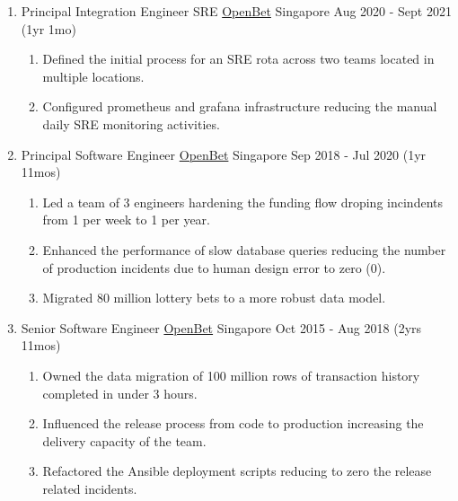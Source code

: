 \documentclass{CVSoftwareEngineer}
\begin{document}
\begin{enumerate}[labelwidth=!, labelindent=0pt, leftmargin=*, rightmargin=15pt]
		\item[] \cvExperience
			{Principal Integration Engineer \textbar SRE}
			{\href{https://www.openbet.com/}{OpenBet}}
			{Singapore}
			{Aug 2020 - Sept 2021 (1yr 1mo)}
			{\begin{enumerate}[labelwidth=!, labelindent=0pt, nosep, leftmargin=*]
					\item[\textasteriskcentered] Defined the initial process for an SRE rota across two teams located in multiple locations.
					\item[\textasteriskcentered] Configured prometheus and grafana infrastructure reducing the manual daily SRE monitoring activities.
				\end{enumerate}
			}

		\item[] \cvExperience
			{Principal Software Engineer}
			{\href{https://www.openbet.com/}{OpenBet}}
			{Singapore}
			{Sep 2018 - Jul 2020 (1yr 11mos)}
			{\begin{enumerate}[labelwidth=!, labelindent=0pt, nosep, leftmargin=*]
					\item[\textasteriskcentered] Led a team of 3 engineers hardening the
						funding flow droping incindents from 1 per week to 1 per year.
					\item[\textasteriskcentered] Enhanced the performance of slow database queries reducing
						the number of production incidents due to human design error to zero (0).
					\item[\textasteriskcentered] Migrated 80 million lottery bets to a more robust data model.
				\end{enumerate}
			}

		\item[] \cvExperience
			{Senior Software Engineer}
			{\href{https://www.openbet.com/}{OpenBet}}
			{Singapore}
			{Oct 2015 - Aug 2018 (2yrs 11mos)}
			{
				\begin{enumerate}[labelwidth=!, labelindent=0pt, nosep, leftmargin=*]
					\item[\textasteriskcentered] Owned the data migration of 100 million rows of
						transaction history completed in under 3 hours.
					\item[\textasteriskcentered] Influenced the release process from code to
						production increasing the delivery capacity of the team.
					\item[\textasteriskcentered] Refactored the Ansible deployment scripts
						reducing to zero the release related incidents.
				\end{enumerate}
			}


\end{enumerate}
\end{document}
